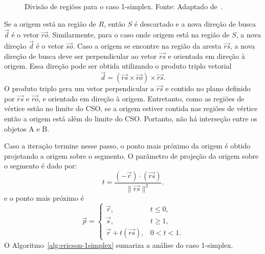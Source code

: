 \begin{figure}[htb]
	\centering
	
	\caption{Divisão de regiões para o caso 1-simplex. Fonte: Adaptado de~\cite{muratori2016implementingGJK}.}
	\label{fig:gjk-ericson-1simplex}
\end{figure}

Se a origem está na região de $R$, então $S$ é descartado e a nova direção de busca $\vec d$ é o vetor $\vec{ro}$. Similarmente, para o caso onde origem está na região de $S$, a nova direção $\vec d$ é o vetor $\vec{so}$. Caso a origem se encontre na região da aresta $\vec{rs}$, a nova direção de busca deve ser perpendicular ao vetor $\vec{rs}$ e orientada em direção à origem. Essa direção pode ser obtida utilizando o produto triplo vetorial
$$
\vec d = (\vec{rs} \times \vec{ro}) \times \vec{rs}.
$$
O produto triplo gera um vetor perpendicular a $\vec{rs}$ e contido no plano definido por $\vec{rs}$ e $\vec{ro}$, e orientado em direção à origem. 
Entretanto, como as regiões de vértice estão no limite do CSO, se a origem estiver contida nas regiões de vértice então a origem está além do limite do CSO. Portanto, não há interseção entre os objetos A e B.

Caso a iteração termine nesse passo, o ponto mais próximo da origem é obtido projetando a origem sobre o segmento. O parâmetro de projeção da origem sobre o segmento é dado por:
$$
t = \frac{(-\vec r) \cdot (\vec{rs})} {\|\vec{rs}\|^2}.
$$
e o ponto mais próximo é
$$
	\vec p =
	\begin{cases}
		\vec r, & t \le 0, \\
		\vec s, & t \ge 1, \\
		\vec r + t(\vec{rs}), & 0<t<1.
	\end{cases}
$$
 O Algoritmo~\ref{alg:ericson-1simplex} sumariza a análise do caso 1-simplex.

